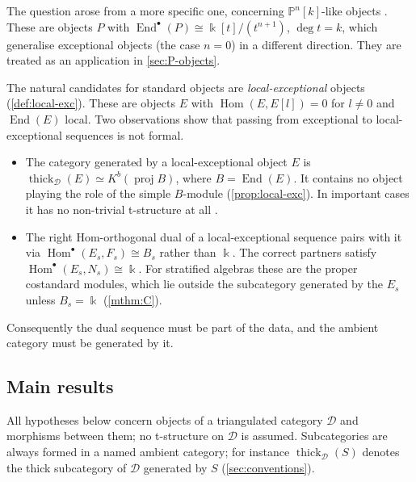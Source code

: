 \documentclass[11pt,reqno]{amsart}
\theoremstyle{plain}
\theoremstyle{definition}
\theoremstyle{remark}
\newcommand{\kk}{\Bbbk}
\DeclareMathOperator{\Hom}{Hom}
\DeclareMathOperator{\End}{End}
\newcommand{\proj}{\operatorname{proj}}
\newcommand{\Kb}{K^b}
\newcommand{\thick}[2][\cD]{\operatorname{thick}_{#1}(#2)}
\newcommand{\Pn}[2]{\mathbb{P}^{#1}[#2]}
\newcommand{\cD}{\mathcal{D}}
\begin{document}
The question arose from a more specific one, concerning $\Pn nk$-like objects \cite{HT06,Kru18,HK19}. These are objects $P$ with $\End^\bullet(P)\cong\kk[t]/(t^{n+1})$, $\deg t=k$, which generalise exceptional objects (the case $n=0$) in a different direction. They are treated as an application in \cref{sec:P-objects}.

The natural candidates for standard objects are \emph{local-exceptional} objects (\cref{def:local-exc}). These are objects $E$ with $\Hom(E,E[l])=0$ for $l\ne0$ and $\End(E)$ local. Two observations show that passing from exceptional to local-exceptional sequences is not formal.
\begin{itemize}
\item The category generated by a local-exceptional object $E$ is $\thick{E}\simeq\Kb(\proj B)$, where $B=\End(E)$. It contains no object playing the role of the simple $B$-module (\cref{prop:local-exc}). In important cases it has no non-trivial t-structure at all \cite{HJY13,Bonf26}.
\item The right Hom-orthogonal dual of a local-exceptional sequence pairs with it via $\Hom^\bullet(E_s,F_s)\cong B_s$ rather than $\kk$. The correct partners satisfy $\Hom^\bullet(E_s,N_s)\cong\kk$. For stratified algebras these are the proper costandard modules, which lie outside the subcategory generated by the $E_s$ unless $B_s=\kk$ (\cref{mthm:C}).
\end{itemize}
Consequently the dual sequence must be part of the data, and the ambient category must be generated by it.

\subsection{Main results}
All hypotheses below concern objects of a triangulated category $\cD$ and morphisms between them; no t-structure on $\cD$ is assumed. Subcategories are always formed in a named ambient category; for instance $\thick{S}$ denotes the thick subcategory of $\cD$ generated by $S$ (\cref{sec:conventions}).
\end{document}
